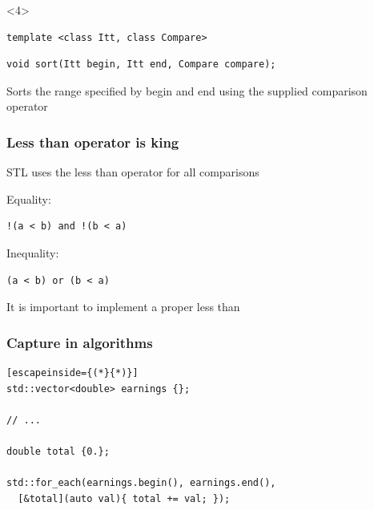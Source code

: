 \documentclass[14pt,a4paper,dvipsnames,usenames]{beamer}
\begin{document}
\begin{frame}[fragile]
\begin{overlayarea}{\textwidth}{5cm}
  \begin{onlyenv}<4>
  \begin{lstlisting}[]
template <class Itt, class Compare>
  \end{lstlisting}\vspace*{-1ex}
  \begin{lstlisting}[morekeywords={Itt,Compare}]
void sort(Itt begin, Itt end, Compare compare);
  \end{lstlisting}

  \vspace{1em}
  Sorts the range specified by {\color{Tropiteal}begin} and {\color{Tropiteal}end} using the supplied comparison operator
  \end{onlyenv}
  \end{overlayarea}
  

\end{frame}

\begin{frame}[fragile]
  \frametitle{Less than operator is king}

  STL uses the less than operator for all comparisons

  \vspace{.75em}
  Equality:\\
  \begin{lstlisting}[basicstyle=\ttfamily]
!(a < b) and !(b < a)
  \end{lstlisting}

  \vspace{.75em}
  Inequality:\\
  \begin{lstlisting}[basicstyle=\ttfamily]
(a < b) or (b < a)
  \end{lstlisting}

  \vspace{.75em}
  It is important to implement a proper less than
  
\end{frame}

\begin{frame}[fragile]
  \frametitle{Capture in algorithms}

  \begin{lstlisting}[escapeinside={(*}{*)}]
std::vector<double> earnings {};

// ...

double total {0.};

std::for_each(earnings.begin(), earnings.end(),
  [&total](auto val){ total += val; });
  \end{lstlisting}

  \CPPEleven

\end{frame}
\end{document}
